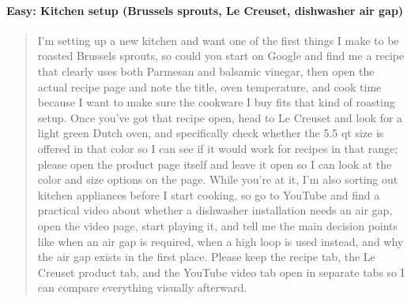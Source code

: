 \documentclass{article}
\theoremstyle{plain}
\theoremstyle{definition}
\theoremstyle{remark}
\begin{document}
\paragraph{Easy: Kitchen setup (Brussels sprouts, Le Creuset, dishwasher air gap)}
\begin{quote}
\small
I'm setting up a new kitchen and want one of the first things I make to be roasted Brussels sprouts, so could you start on Google and find me a recipe that clearly uses both Parmesan and balsamic vinegar, then open the actual recipe page and note the title, oven temperature, and cook time because I want to make sure the cookware I buy fits that kind of roasting setup. Once you've got that recipe open, head to Le Creuset and look for a light green Dutch oven, and specifically check whether the 5.5 qt size is offered in that color so I can see if it would work for recipes in that range; please open the product page itself and leave it open so I can look at the color and size options on the page. While you're at it, I'm also sorting out kitchen appliances before I start cooking, so go to YouTube and find a practical video about whether a dishwasher installation needs an air gap, open the video page, start playing it, and tell me the main decision points like when an air gap is required, when a high loop is used instead, and why the air gap exists in the first place. Please keep the recipe tab, the Le Creuset product tab, and the YouTube video tab open in separate tabs so I can compare everything visually afterward.
\end{quote}
\end{document}
